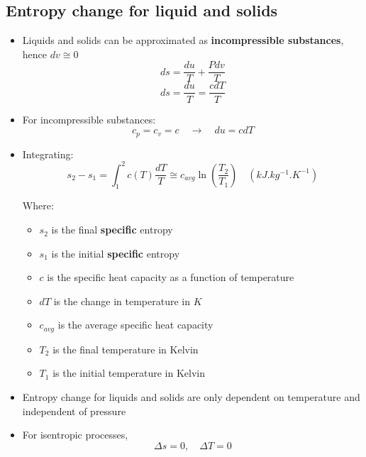 \documentclass[11pt]{article}
\begin{document}
\subsection{Entropy change for liquid and solids}
\label{sec:orga180da2}
\begin{itemize}
\item Liquids and solids can be approximated as \textbf{incompressible substances}, hence \(dv \cong 0\)
\[ds = \frac{du}{T} + \frac{P dv}{T}\]
\[ds = \frac{du}{T} = \frac{c dT}{T}\]
\item For incompressible substances:
\[c_p = c_v = c \quad \rightarrow \quad du = c dT\]
\item Integrating:
\[s_2 - s_1 = \int_1^2 c(T) \frac{dT}{T} \cong c_{avg} \ln \left(\frac{T_2}{T_1} \right) \quad (\unit{kJ.kg^{-1}.K^{-1}})\]

Where:
\begin{itemize}
\item \(s_2\) is the final \textbf{specific} entropy
\item \(s_1\) is the initial \textbf{specific} entropy
\item \(c\) is the specific heat capacity as a function of temperature
\item \(dT\) is the change in temperature in \(\unit{K}\)
\item \(c_{avg}\) is the average specific heat capacity
\item \(T_2\) is the final temperature in Kelvin
\item \(T_1\) is the initial temperature in Kelvin
\end{itemize}

\item Entropy change for liquids and solids are only dependent on temperature and independent of pressure
\item For isentropic processes,
\[\Delta s = 0, \quad \Delta T = 0\]
\end{itemize}

 \newpage
\end{document}
